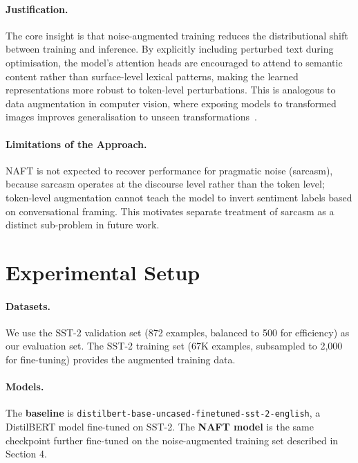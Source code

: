 \documentclass[sigconf]{acmart}
\begin{document}
\paragraph{Justification.}
The core insight is that noise-augmented training reduces the
distributional shift between training and inference.
By explicitly including perturbed text during optimisation, the
model's attention heads are encouraged to attend to semantic
content rather than surface-level lexical patterns, making the
learned representations more robust to token-level perturbations.
This is analogous to data augmentation in computer vision, where
exposing models to transformed images improves generalisation to
unseen transformations~\cite{shorten2019survey}.

\paragraph{Limitations of the Approach.}
NAFT is not expected to recover performance for pragmatic noise
(sarcasm), because sarcasm operates at the discourse level rather
than the token level; token-level augmentation cannot teach the
model to invert sentiment labels based on conversational framing.
This motivates separate treatment of sarcasm as a distinct
sub-problem in future work.

\section{Experimental Setup}

\paragraph{Datasets.}
We use the SST-2 validation set (872 examples, balanced to 500 for
efficiency) as our evaluation set.
The SST-2 training set (67K examples, subsampled to 2,000 for
fine-tuning) provides the augmented training data.

\paragraph{Models.}
The \textbf{baseline} is
\texttt{distilbert-base-uncased-finetuned-sst-2-english}, a
DistilBERT model fine-tuned on SST-2.
The \textbf{NAFT model} is the same checkpoint further fine-tuned
on the noise-augmented training set described in Section 4.
\end{document}
